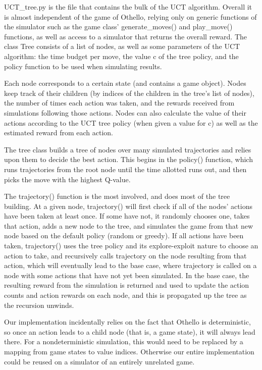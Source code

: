 \documentclass[12pt,letterpaper]{article}
\begin{document}
UCT\_tree.py is the file that contains the bulk of the UCT algorithm. Overall it is almost independent of the game of Othello, relying only on generic functions of the simulator such as the game class' generate\_moves() and play\_move() functions, as well as access to a simulator that returns the overall reward. The class Tree consists of a list of nodes, as well as some parameters of the UCT algorithm: the time budget per move, the value c of the tree policy, and the policy function to be used when simulating results.

Each node corresponds to a certain state (and contains a game object). Nodes keep track of their children (by indices of the children in the tree's list of nodes), the number of times each action was taken, and the rewards received from simulations following those actions. Nodes can also calculate the value of their actions according to the UCT tree policy (when given a value for c) as well as the estimated reward from each action.

The tree class builds a tree of nodes over many simulated trajectories and relies upon them to decide the best action. This begins in the policy() function, which runs trajectories from the root node until the time allotted runs out, and then picks the move with the highest Q-value.

The trajectory() function is the most involved, and does most of the tree building. At a given node, trajectory() will first check if all of the nodes' actions have been taken at least once. If some have not, it randomly chooses one, takes that action, adds a new node to the tree, and simulates the game from that new node based on the default policy (random or greedy). If all actions have been taken, trajectory() uses the tree policy and its explore-exploit nature to choose an action to take, and recursively calls trajectory on the node resulting from that action, which will eventually lead to the base case, where trajectory is called on a node with some actions that have not yet been simulated. In the base case, the resulting reward from the simulation is returned and used to update the action counts and action rewards on each node, and this is propagated up the tree as the recursion unwinds.

Our implementation incidentally relies on the fact that Othello is deterministic, so once an action leads to a child node (that is, a game state), it will always lead there. For a nondeterministic simulation, this would need to be replaced by a mapping from game states to value indices. Otherwise our entire implementation could be reused on a simulator of an entirely unrelated game.
\end{document}
